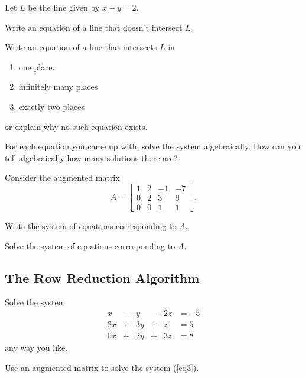 \documentclass[14pt]{problemset}
\begin{document}
	\question
	Let $L$ be the line given by $x-y=2$.
	\begin{parts}
		\item Write an equation of a line that doesn't intersect $L$.
		\item Write an equation of a line that intersects $L$ in 
		\begin{enumerate}
			\item one place.
			\item infinitely many places
			\item exactly two places
		\end{enumerate}
		or explain why no such equation exists.
		\item For each equation you came up with, solve the system algebraically.
		How can you tell algebraically how many solutions there are?
	\end{parts}

	\newpage
	\question
	Consider the augmented matrix
	\[
		A=\left[\begin{array}{ccc|c}
			1 & 2 & -1 & -7\\
			0 & 2 & 3 & 9\\
			0 & 0 & 1 & 1
		\end{array}\right].
	\]
	\begin{parts}
		\item Write the system of equations corresponding to $A$.
		\item Solve the system of equations corresponding to $A$.
	\end{parts}

\subsection*{The Row Reduction Algorithm}


	\question
	\begin{parts}
		\item Solve the system
		\begin{equation}\label{eq3}
			\begin{array}{rcrcrl}
				x&-&y&-&2z &= -5\\
				2x&+&3y&+&z &= 5\\
				0x&+&2y&+&3z &= 8
			\end{array}
		\end{equation}
		any way you like.

		\item Use an augmented matrix to solve the system (\ref{eq3}).
	\end{parts}
\end{document}
